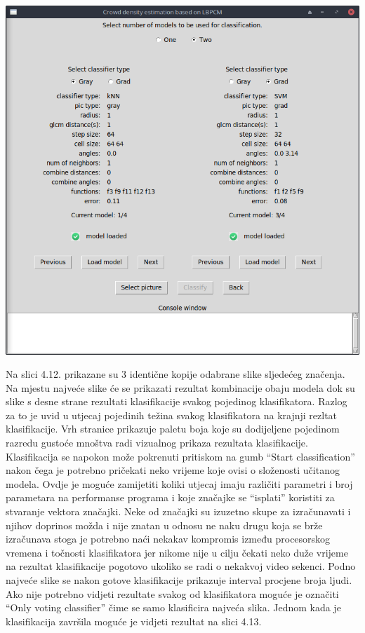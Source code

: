 \documentclass[times, utf8, zavrsni]{fer}
\begin{document}
\begin{minipage}{\linewidth}
\centering
\includegraphics[scale=0.4]{img/cl2.png}
\end{minipage}

\bigbreak

Na slici 4.12. prikazane su 3 identične kopije odabrane slike sljedećeg 
značenja. Na mjestu najveće slike će se prikazati rezultat kombinacije 
obaju modela dok su slike s desne strane rezultati klasifikacije svakog 
pojedinog klasifikatora. 
Razlog za to je uvid u utjecaj pojedinih težina svakog klasifikatora na 
krajnji rezltat klasifikacije. Vrh stranice prikazuje paletu boja koje
su dodijeljene pojedinom razredu gustoće mnoštva radi vizualnog
prikaza rezultata klasifikacije. Klasifikacija se napokon može pokrenuti
pritiskom na gumb \enquote{Start classification} nakon čega je potrebno
pričekati neko vrijeme koje ovisi o složenosti učitanog modela. 
Ovdje je moguće zamijetiti koliki utjecaj imaju različiti parametri i broj parametara 
na performanse programa i koje značajke se \enquote{isplati}
koristiti za stvaranje vektora značajki. Neke od značajki su izuzetno 
skupe za izračunavati i njihov doprinos možda i nije znatan u odnosu 
ne naku drugu koja se brže izračunava stoga je potrebno naći nekakav
kompromis između procesorskog vremena i točnosti klasifikatora jer 
nikome nije u cilju čekati neko duže vrijeme na rezultat klasifikacije pogotovo
ukoliko se radi o nekakvoj video sekenci.
Podno najveće slike se nakon gotove klasifikacije prikazuje interval
procjene broja ljudi. Ako nije potrebno vidjeti rezultate svakog od
klasifikatora moguće je označiti  \enquote{Only voting classifier}
čime se samo klasificira najveća slika. Jednom kada je klasifikacija 
završila moguće je vidjeti rezultat na slici 4.13.
\end{document}
